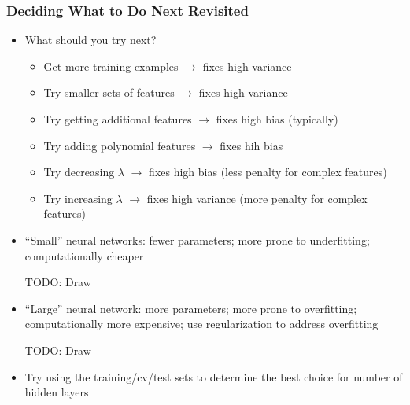 \subsubsection{Deciding What to Do Next Revisited}
\begin{itemize}[--]
	\item What should you try next?
	\begin{itemize}[--]
		\item Get more training examples $\to$ fixes high variance
		\item Try smaller sets of features  $\to$ fixes high variance
		\item Try getting additional features $\to$ fixes high bias (typically)
		\item Try adding polynomial features $\to$ fixes hih bias
		\item Try decreasing $\lambda$ $\to$ fixes high bias (less penalty for complex features)
		\item Try increasing $\lambda$ $\to$ fixes high variance (more penalty for complex features)
	\end{itemize}

	\item ``Small'' neural networks: fewer parameters; more prone to underfitting; computationally cheaper

	TODO: Draw

	\item ``Large'' neural network: more parameters; more prone to overfitting; computationally more expensive; use regularization to address overfitting

	TODO: Draw

	\item Try using the training/cv/test sets to determine the best choice for number of hidden layers
\end{itemize}
